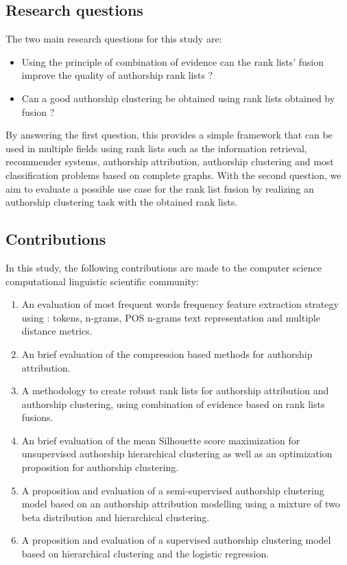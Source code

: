 \subsection{Research questions}

The two main research questions for this study are:

\begin{itemize}
  \item Using the principle of combination of evidence can the rank lists' fusion improve the quality of authorship rank lists ?
  \item Can a good authorship clustering be obtained using rank lists obtained by fusion ?
\end{itemize}

By answering the first question, this provides a simple framework that can be used in multiple fields using rank lists such as the information retrieval, recommender systems, authorship attribution, authorship clustering and most classification problems based on complete graphs.
With the second question, we aim to evaluate a possible use case for the rank list fusion by realizing an authorship clustering task with the obtained rank lists.

\subsection{Contributions}

In this study, the following contributions are made to the computer science computational linguistic scientific community:

\begin{enumerate}
  \item An evaluation of most frequent words frequency feature extraction strategy using : tokens, n-grams, POS n-grams text representation and multiple distance metrics.
  \item An brief evaluation of the compression based methods for authorship attribution.
  \item A methodology to create robust rank lists for authorship attribution and authorship clustering, using combination of evidence based on rank lists fusions.
  \item An brief evaluation of the mean Silhouette score maximization for unsupervised authorship hierarchical clustering as well as an optimization proposition for authorship clustering.
  \item A proposition and evaluation of a semi-supervised authorship clustering model based on an authorship attribution modelling using a mixture of two beta distribution and hierarchical clustering.
  \item A proposition and evaluation of a supervised authorship clustering model based on hierarchical clustering and the logistic regression.
\end{enumerate}


